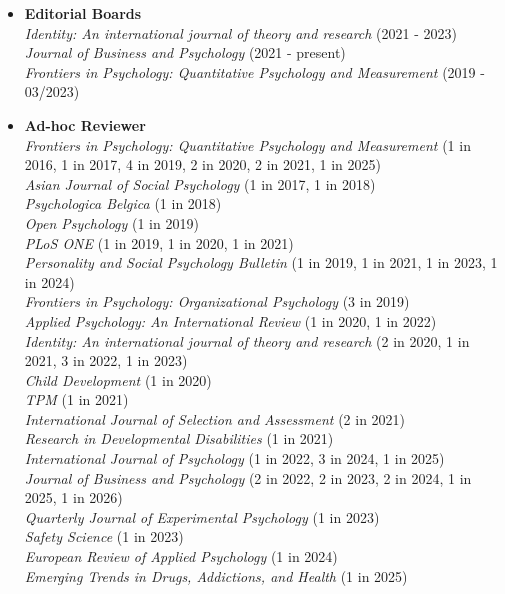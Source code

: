 \documentclass[hidelinks, letterpaper,10pt]{article} %
\begin{document}
\begin{itemize} 
	\setlength{\topsep}{0pt}%
	\setlength{\leftmargin}{0.1in}%
	
\item {\textbf{\large{Editorial Boards}}}\\
	\textit{Identity: An international journal of theory and research} (2021 - 2023)\\
	\textit{Journal of Business and Psychology} (2021 - present)\\
	\textit{Frontiers in Psychology: Quantitative Psychology and Measurement} (2019 - 03/2023)\\
	
\item {\textbf{\large{Ad-hoc Reviewer}}}\\
	\textit{Frontiers in Psychology: Quantitative Psychology and Measurement} (1 in 2016, 1 in 2017, 4 in 2019, 2 in 2020, 2 in 2021, 1 in 2025) \\
    \textit{Asian Journal of Social Psychology} (1 in 2017, 1 in 2018) \\
    \textit{Psychologica Belgica} (1 in 2018) \\
	\textit{Open Psychology} (1 in 2019) \\
	\textit{PLoS ONE} (1 in 2019, 1 in 2020, 1 in 2021) \\
	\textit{Personality and Social Psychology Bulletin} (1 in 2019, 1 in 2021, 1 in 2023, 1 in 2024) \\
	\textit{Frontiers in Psychology: Organizational Psychology} (3 in 2019) \\
	\textit{Applied Psychology: An International Review} (1 in 2020, 1 in 2022) \\
	\textit{Identity: An international journal of theory and research} (2 in 2020, 1 in 2021, 3 in 2022, 1 in 2023) \\
	\textit{Child Development} (1 in 2020) \\
	\textit{TPM} (1 in 2021) \\
	\textit{International Journal of Selection and Assessment} (2 in 2021) \\
	\textit{Research in Developmental Disabilities} (1 in 2021) \\
	\textit{International Journal of Psychology} (1 in 2022, 3 in 2024, 1 in 2025) \\
	\textit{Journal of Business and Psychology} (2 in 2022, 2 in 2023, 2 in 2024, 1 in 2025, 1 in 2026) \\
    \textit{Quarterly Journal of Experimental Psychology} (1 in 2023) \\
    \textit{Safety Science} (1 in 2023) \\
    \textit{European Review of Applied Psychology} (1 in 2024) \\
    \textit{Emerging Trends in Drugs, Addictions, and Health} (1 in 2025)


\end{itemize}
\end{document}
